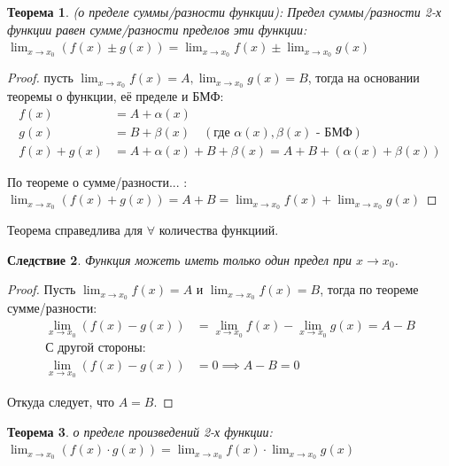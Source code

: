 \documentclass[12pt, a4paper]{article}
\newtheorem{theorem}{Теорема}[subsection]
\newtheorem{corollary}[theorem]{Следствие}
\theoremstyle{remark}
\newcommand{\Y}{\mathbb{\forall}}
\begin{document}
	\begin{theorem}
		(о пределе суммы/разности функции): Предел суммы/разности 2-х функции равен сумме/разности пределов эти функции: \\
		
		$\lim_{x \to x_0} (f(x) \pm g(x)) = \lim_{x \to x_0} f(x) \pm \lim_{x \to x_0} g(x)$
	\end{theorem}
	
	\begin{proof}
		пусть \(\lim_{x \to x_0} f(x) = A, \lim_{x \to x_0} g(x) = B\), тогда на основании теоремы о функции, её пределе и БМФ: \\
		
		\begin{align*}
			f(x) &= A + \alpha(x) \\
			g(x) &= B + \beta(x) \quad (\text{где } \alpha(x), \beta(x) \text{ - БМФ}) \\
			f(x) + g(x) &= A + \alpha(x) + B + \beta(x) = A + B + (\alpha(x) + \beta(x))
		\end{align*}
		
		По теореме о сумме/разности... : \\
		
		$\lim_{x \to x_0} (f(x) + g(x)) = A + B = \lim_{x \to x_0} f(x) + \lim_{x \to x_0} g(x)$
	\end{proof}
	
	Теорема справедлива для $\Y$ количества функциий. 
	
	\begin{corollary}
		Функция можеть иметь только один предел при \(x \to x_0\).
	\end{corollary}
	
	\begin{proof}
		Пусть \(\lim_{x \to x_0} f(x) = A\) и \(\lim_{x \to x_0} f(x) = B\), тогда по теореме сумме/разности: \\
		
		\begin{align*}
			\lim_{x \to x_0} (f(x) - g(x)) &= \lim_{x \to x_0} f(x) - \lim_{x \to x_0} g(x) = A - B \\
			\text{С другой стороны:} \\
			\lim_{x \to x_0} (f(x) - g(x)) &= 0 \implies A - B = 0
		\end{align*}
		
		Откуда следует, что $A = B$.
	\end{proof}
	
	\begin{theorem}
		о пределе произведений 2-х функции: \\
		
		$\lim_{x \to x_0} (f(x) \cdot g(x)) = \lim_{x \to x_0} f(x) \cdot \lim_{x \to x_0} g(x)$
	\end{theorem}
	
\end{document}
